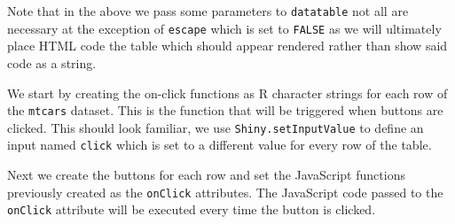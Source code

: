 \documentclass[
]{krantz}
\makeatletter
\newenvironment{Shaded}{\begin{snugshade}}{\end{snugshade}}
\newcommand{\CommentTok}[1]{\textcolor[rgb]{0.37,0.37,0.37}{\textit{#1}}}
\newcommand{\ControlFlowTok}[1]{\textcolor[rgb]{0.27,0.27,0.27}{\textbf{#1}}}
\newcommand{\DataTypeTok}[1]{\textcolor[rgb]{0.27,0.27,0.27}{#1}}
\newcommand{\KeywordTok}[1]{\textcolor[rgb]{0.27,0.27,0.27}{\textbf{#1}}}
\newcommand{\NormalTok}[1]{#1}
\newcommand{\OperatorTok}[1]{\textcolor[rgb]{0.43,0.43,0.43}{\textbf{#1}}}
\newcommand{\OtherTok}[1]{\textcolor[rgb]{0.37,0.37,0.37}{#1}}
\newcommand{\StringTok}[1]{\textcolor[rgb]{0.5,0.5,0.5}{#1}}
\newenvironment{kframe}{%
\medskip{}
\setlength{\fboxsep}{.8em}
 \def\at@end@of@kframe{}%
 \ifinner\ifhmode%
  \def\at@end@of@kframe{\end{minipage}}%
  \begin{minipage}{\columnwidth}%
 \fi\fi%
 \def\FrameCommand##1{\hskip\@totalleftmargin \hskip-\fboxsep
 \colorbox{shadecolor}{##1}\hskip-\fboxsep
     \hskip-\linewidth \hskip-\@totalleftmargin \hskip\columnwidth}%
 \MakeFramed {\advance\hsize-\width
   \@totalleftmargin\z@ \linewidth\hsize
   \@setminipage}}%
 {\par\unskip\endMakeFramed%
 \at@end@of@kframe}
\renewenvironment{Shaded}{\begin{kframe}}{\end{kframe}}
\makeatother
\begin{document}
Note that in the above we pass some parameters to \texttt{datatable} not all are necessary at the exception of \texttt{escape} which is set to \texttt{FALSE} as we will ultimately place HTML code the table which should appear rendered rather than show said code as a string.

We start by creating the on-click functions as R character strings for each row of the \texttt{mtcars} dataset. This is the function that will be triggered when buttons are clicked. This should look familiar, we use \texttt{Shiny.setInputValue} to define an input named \texttt{click} which is set to a different value for every row of the table.

\begin{Shaded}
\end{Shaded}

Next we create the buttons for each row and set the JavaScript functions previously created as the \texttt{onClick} attributes. The JavaScript code passed to the \texttt{onClick} attribute will be executed every time the button is clicked.
\end{document}
